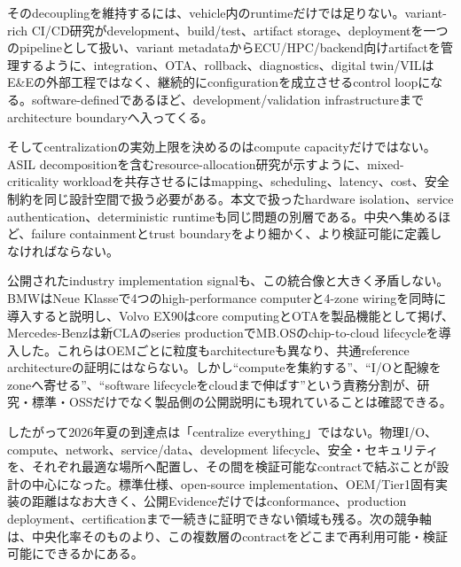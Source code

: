 \begin{surveyarticlebody}
そのdecouplingを維持するには、vehicle内のruntimeだけでは足りない。variant-rich CI/CD研究がdevelopment、build/test、artifact storage、deploymentを一つのpipelineとして扱い、variant metadataからECU/HPC/backend向けartifactを管理するように、integration、OTA、rollback、diagnostics、digital twin/VILはE\&Eの外部工程ではなく、継続的にconfigurationを成立させるcontrol loopになる。software-definedであるほど、development/validation infrastructureまでarchitecture boundaryへ入ってくる。\autocite{src-e71ad506dc03}

そしてcentralizationの実効上限を決めるのはcompute capacityだけではない。ASIL decompositionを含むresource-allocation研究が示すように、mixed-criticality workloadを共存させるにはmapping、scheduling、latency、cost、安全制約を同じ設計空間で扱う必要がある。本文で扱ったhardware isolation、service authentication、deterministic runtimeも同じ問題の別層である。中央へ集めるほど、failure containmentとtrust boundaryをより細かく、より検証可能に定義しなければならない。\autocite{src-f657aea94b5e}

公開されたindustry implementation signalも、この統合像と大きく矛盾しない。BMWはNeue Klasseで4つのhigh-performance computerと4-zone wiringを同時に導入すると説明し、Volvo EX90はcore computingとOTAを製品機能として掲げ、Mercedes-Benzは新CLAのseries productionでMB.OSのchip-to-cloud lifecycleを導入した。これらはOEMごとに粒度もarchitectureも異なり、共通reference architectureの証明にはならない。しかし``computeを集約する''、``I/Oと配線をzoneへ寄せる''、``software lifecycleをcloudまで伸ばす''という責務分割が、研究・標準・OSSだけでなく製品側の公開説明にも現れていることは確認できる。\autocite{src-1096d739982f,src-76ffc13a4115,src-e08dbef62089}

したがって2026年夏の到達点は「centralize everything」ではない。物理I/O、compute、network、service/data、development lifecycle、安全・セキュリティを、それぞれ最適な場所へ配置し、その間を検証可能なcontractで結ぶことが設計の中心になった。標準仕様、open-source implementation、OEM/Tier1固有実装の距離はなお大きく、公開Evidenceだけではconformance、production deployment、certificationまで一続きに証明できない領域も残る。次の競争軸は、中央化率そのものより、この複数層のcontractをどこまで再利用可能・検証可能にできるかにある。\autocite{src-0d68a9a04e3d,src-4e0a35202b0f,src-d63061aaba8e,src-e71ad506dc03}
\end{surveyarticlebody}

